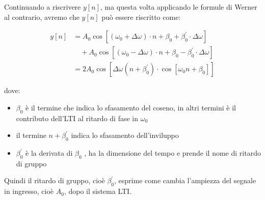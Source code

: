 Continuando a riscrivere $y \left[ n\right]$, ma questa volta applicando le formule di Werner al contrario, 
avremo che $y \left[ n\right]$ può essere riscritto come: 

{
    \Large 
    \begin{equation}
        \begin{split}
        y \left[ n\right]&  
        =  
        A_0
        \cos 
        \left[ 
        \left(\omega_0 + \Delta \omega\right) 
        \cdot
        n 
        + 
        \beta_0 
        + 
        \beta_0^{'}
        \cdot 
        \Delta \omega
        \right] 
        \\
        &\quad
        + 
        A_0
        \cos 
        \left[ 
        \left(\omega_0 - \Delta \omega\right) 
        \cdot
        n 
        + 
        \beta_0 
        - 
        \beta_0^{'}
        \cdot 
        \Delta \omega
        \right] 
        \\
        &=
        2 A_0 
        \cos 
        \left[ 
            \Delta \omega \left( n + \beta_0^{'}\right)
            \cdot 
            \cos \left[ \omega_0 n + \beta_0\right]
        \right]
        \end{split}
        \end{equation}
} 

dove: 

\begin{itemize}
    \item $\beta_0$ è il termine che indica lo sfasamento del coseno, in altri termini è il contributo dell'LTI al ritardo di fase in $\omega_0$ 
    \item il termine $n + \beta_0^{'}$ indica lo sfasamento dell'inviluppo 
    \item $\beta_0^{'}$ è la derivata di $\beta_0$ , ha la dimensione del tempo e prende il nome di ritardo di gruppo
\end{itemize}

Quindi il ritardo di gruppo, cioè $\beta_0^{'}$, esprime come cambia l'ampiezza del segnale in ingresso, cioè $A_0$, dopo il sistema LTI. \newline 

